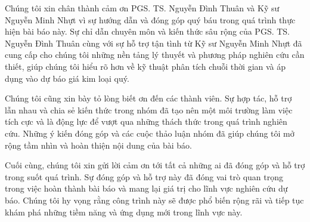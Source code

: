 Chúng tôi xin chân thành cảm ơn PGS. TS. Nguyễn Đình Thuân và Kỹ sư Nguyễn Minh Nhựt vì sự hướng dẫn và đóng góp quý báu trong quá trình thực hiện bài báo này. Sự chỉ dẫn chuyên môn và kiến thức sâu rộng của PGS. TS. Nguyễn Đình Thuân cùng với sự hỗ trợ tận tình từ Kỹ sư Nguyễn Minh Nhựt đã cung cấp cho chúng tôi những nền tảng lý thuyết và phương pháp nghiên cứu cần thiết, giúp chúng tôi hiểu rõ hơn về kỹ thuật phân tích chuỗi thời gian và áp dụng vào dự báo giá kim loại quý.

Chúng tôi cũng xin bày tỏ lòng biết ơn đến các thành viên. Sự hợp tác, hỗ trợ lẫn nhau và chia sẻ kiến thức trong nhóm đã tạo nên một môi trường làm việc tích cực và là động lực để vượt qua những thách thức trong quá trình nghiên cứu. Những ý kiến đóng góp và các cuộc thảo luận nhóm đã giúp chúng tôi mở rộng tầm nhìn và hoàn thiện nội dung của bài báo.

Cuối cùng, chúng tôi xin gửi lời cảm ơn tới tất cả những ai đã đóng góp và hỗ trợ trong suốt quá trình. Sự đóng góp và hỗ trợ này đã đóng vai trò quan trọng trong việc hoàn thành bài báo và mang lại giá trị cho lĩnh vực nghiên cứu dự báo. Chúng tôi hy vọng rằng công trình này sẽ được phổ biến rộng rãi và tiếp tục khám phá những tiềm năng và ứng dụng mới trong lĩnh vực này.
